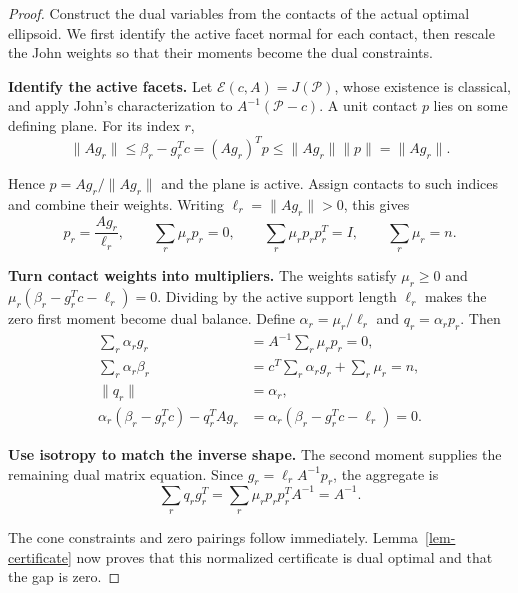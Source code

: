 \begin{proof}
Construct the dual variables from the contacts of the actual
optimal ellipsoid. We first identify the active facet normal for each contact,
then rescale the John weights so that their moments become the dual constraints.

\textbf{Identify the active facets.} Let $\mathcal E(c,A)=J(\mathcal P)$,
whose existence is classical, and apply John's characterization to
$A^{-1}(\mathcal P-c)$. A unit contact $p$ lies on some defining plane.
For its index $r$,
\begin{equation}\label{eq:2.10}
\|Ag_r\|\le\beta_r-g_r^Tc=(Ag_r)^Tp
\le\|Ag_r\|\|p\|=\|Ag_r\|.
\end{equation}

Hence $p=Ag_r/\|Ag_r\|$ and the plane is active. Assign contacts to such indices and combine their weights. Writing $\ell_r=\|Ag_r\|>0$, this gives
\begin{equation}\label{eq:2.11}
p_r=\frac{Ag_r}{\ell_r},\qquad
\sum_r\mu_rp_r=0,\qquad
\sum_r\mu_rp_rp_r^T=I,\qquad \sum_r\mu_r=n.
\end{equation}

\textbf{Turn contact weights into multipliers.} The weights satisfy $\mu_r\ge0$ and
$\mu_r(\beta_r-g_r^Tc-\ell_r)=0$. Dividing by the active support length
$\ell_r$ makes the zero first moment become dual balance.
Define $\alpha_r=\mu_r/\ell_r$ and $q_r=\alpha_rp_r$. Then
\begin{equation}\label{eq:2.12}
\begin{aligned}
\sum_r\alpha_rg_r&=A^{-1}\sum_r\mu_rp_r=0,\\
\sum_r\alpha_r\beta_r
&=c^T\sum_r\alpha_rg_r+\sum_r\mu_r=n,\\
\|q_r\|&=\alpha_r,\\
\alpha_r(\beta_r-g_r^Tc)-q_r^TAg_r
&=\alpha_r(\beta_r-g_r^Tc-\ell_r)=0.
\end{aligned}
\end{equation}

\textbf{Use isotropy to match the inverse shape.} The second moment supplies the
remaining dual matrix equation. Since $g_r=\ell_rA^{-1}p_r$, the aggregate is
\begin{equation}\label{eq:2.13}
\sum_rq_rg_r^T=\sum_r\mu_rp_rp_r^TA^{-1}=A^{-1}.
\end{equation}

The cone constraints and zero pairings follow immediately. Lemma~\ref{lem-certificate} now proves that this normalized certificate is dual optimal and that the gap is zero. 
\end{proof}

